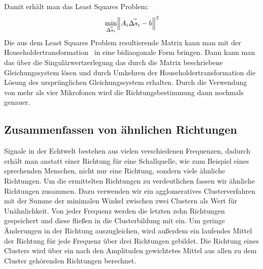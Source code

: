 Damit erhält man das Least Squares Problem:
\begin{equation}
    \min_{\vec{\Delta{s}_i}}{\norm{A_i\vec{\Delta{s}_i} - b}^2}
\end{equation}
Die aus dem Least Squares Problem resultierende Matrix kann man mit der Householdertransformation~\cite{householder2006principles} in eine bidiaogonale Form bringen. Dann kann man das über die Singulärwertzerlegung das durch die Matrix beschriebene Gleichungssystem lösen und durch Umkehren der Householdertransformation die Lösung des ursprünglichen Gleichungssystem erhalten. Durch die Verwendung von mehr als vier Mikrofonen wird die Richtungsbestimmung dann nochmals genauer.
\subsection{Zusammenfassen von ähnlichen Richtungen}
Signale in der Echtwelt bestehen aus vielen verschiedenen Frequenzen, dadurch erhält man anstatt einer Richtung für eine Schallquelle, wie zum Beispiel eines sprechenden Menschen, nicht nur eine Richtung, sondern viele ähnliche Richtungen. Um die ermittelten Richtungen zu verdeutlichen fassen wir ähnliche Richtungen zusammen. Dazu verwenden wir ein agglomeratives Clusterverfahren mit der Summe der minimalen Winkel zwischen zwei Clustern als Wert für Unähnlichkeit. Von jeder Frequenz werden die letzten zehn Richtungen gespeichert und diese fließen in die Clusterbildung mit ein. Um geringe Änderungen in der Richtung auszugleichen, wird außerdem ein laufendes Mittel der Richtung für jede Frequenz über drei Richtungen gebildet. Die Richtung eines Clusters wird über ein nach den Amplituden gewichtetes Mittel aus allen zu dem Cluster gehörenden Richtungen berechnet.